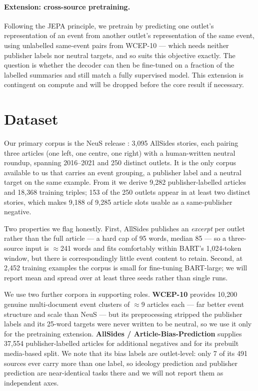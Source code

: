 \documentclass[10pt,twocolumn,a4paper]{article}
\begin{document}
\paragraph{Extension: cross-source pretraining.} Following the JEPA principle, we
pretrain by predicting one outlet's representation of an event from another
outlet's representation of the same event, using unlabelled same-event pairs from
WCEP-10 --- which needs neither publisher labels nor neutral targets, and so
suits this objective exactly. The question is whether the decoder can then be
fine-tuned on a fraction of the labelled summaries and still match a fully
supervised model. This extension is contingent on compute and will be dropped
before the core result if necessary.

\section{Dataset}

Our primary corpus is the NeuS release \cite{lee2022neus}: 3{,}095 AllSides
stories, each pairing three articles (one left, one centre, one right) with a
human-written neutral roundup, spanning 2016--2021 and 250 distinct outlets. It
is the only corpus available to us that carries an event grouping, a publisher
label and a neutral target on the same example. From it we derive 9{,}282
publisher-labelled articles and 18{,}368 training triples; 153 of the 250 outlets
appear in at least two distinct stories, which makes 9{,}188 of 9{,}285 article
slots usable as a same-publisher negative.

Two properties we flag honestly. First, AllSides publishes an \emph{excerpt} per
outlet rather than the full article --- a hard cap of 95 words, median 85 --- so
a three-source input is $\approx$241 words and fits comfortably within BART's
1{,}024-token window, but there is correspondingly little event content to
retain. Second, at 2{,}452 training examples the corpus is small for fine-tuning
BART-large; we will report mean and spread over at least three seeds rather than
single runs.

We use two further corpora in supporting roles. \textbf{WCEP-10}
\cite{ghalandari2020wcep} provides 10{,}200 genuine multi-document event clusters
of $\approx$9 articles each --- far better event structure and scale than NeuS
--- but its preprocessing stripped the publisher labels and its 25-word targets
were never written to be neutral, so we use it only for the pretraining
extension. \textbf{AllSides / Article-Bias-Prediction} \cite{baly2020detect}
supplies 37{,}554 publisher-labelled articles for additional negatives and for
its prebuilt media-based split. We note that its bias labels are outlet-level:
only 7 of its 491 sources ever carry more than one label, so ideology prediction
and publisher prediction are near-identical tasks there and we will not report
them as independent axes.
\end{document}
